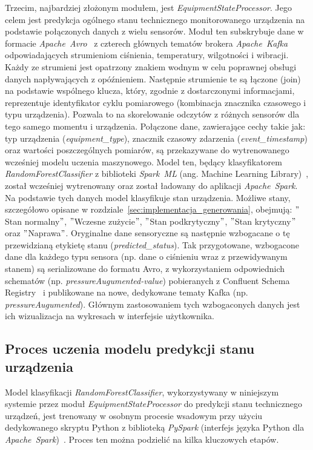 Trzecim, najbardziej złożonym modułem, jest \textit{EquipmentStateProcessor}. Jego celem jest predykcja ogólnego stanu technicznego monitorowanego urządzenia na podstawie połączonych danych z wielu sensorów. Moduł ten subskrybuje dane w formacie \mbox{\textit{Apache Avro}}~\cite{avro_documentation} z czterech głównych tematów brokera \mbox{\textit{Apache Kafka}} odpowiadających strumieniom ciśnienia, temperatury, wilgotności i wibracji. Każdy ze strumieni jest opatrzony znakiem wodnym w celu poprawnej obsługi danych napływających z opóźnieniem. Następnie strumienie te są łączone (join) na podstawie wspólnego klucza, który, zgodnie z dostarczonymi informacjami, reprezentuje identyfikator cyklu pomiarowego (kombinacja znacznika czasowego i typu urządzenia). Pozwala to na skorelowanie odczytów z różnych sensorów dla tego samego momentu i urządzenia. Połączone dane, zawierające cechy takie jak: typ urządzenia (\textit{equipment\_type}), znacznik czasowy zdarzenia (\textit{event\_timestamp}) oraz wartości poszczególnych pomiarów, są przekazywane do wytrenowanego wcześniej modelu uczenia maszynowego. Model ten, będący klasyfikatorem \textit{RandomForestClassifier} z biblioteki \mbox{\textit{Spark ML}} (ang. Machine Learning Library)~\cite{spark_mllib_reference}, został wcześniej wytrenowany oraz został ładowany do aplikacji \mbox{\textit{Apache Spark}}. Na podstawie tych danych model klasyfikuje stan urządzenia. Możliwe stany, szczegółowo opisane w rozdziale~\ref{sec:implementacja_generowania}, obejmują: \("\)Stan normalny\("\), \("\)Wczesne zużycie\("\), \("\)Stan podkrytyczny\("\), \("\)Stan krytyczny\("\) oraz \("\)Naprawa\("\). Oryginalne dane sensoryczne są następnie wzbogacane o tę przewidzianą etykietę stanu (\textit{predicted\_status}). Tak przygotowane, wzbogacone dane dla każdego typu sensora (np. dane o ciśnieniu wraz z przewidywanym stanem) są serializowane do formatu Avro, z wykorzystaniem odpowiednich schematów (np. \textit{pressureAugumented-value}) pobieranych z Confluent Schema Registry~\cite{confluent_schema_registry} i publikowane na nowe, dedykowane tematy Kafka (np. \textit{pressureAugumented}). Głównym zastosowaniem tych wzbogaconych danych jest ich wizualizacja na wykresach w interfejsie użytkownika.

\subsection{Proces uczenia modelu predykcji stanu urządzenia}
\label{subsec:uczenie_modelu_stanu}

Model klasyfikacji \textit{RandomForestClassifier}, wykorzystywany w niniejszym systemie przez moduł \textit{EquipmentStateProcessor} do predykcji stanu technicznego urządzeń, jest trenowany w osobnym procesie wsadowym przy użyciu dedykowanego skryptu Python z biblioteką \mbox{\textit{PySpark}} (interfejs języka Python dla \mbox{\textit{Apache Spark}})~\cite{pyspark_docs}. Proces ten można podzielić na kilka kluczowych etapów.

